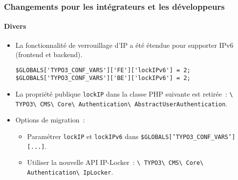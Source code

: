 \begin{frame}[fragile]
	\frametitle{Changements pour les intégrateurs et les développeurs}
	\framesubtitle{Divers}

	\lstset{basicstyle=\tiny\ttfamily}

	\begin{itemize}

		\item La fonctionnalité de verrouillage d'IP a été étendue pour supporter IPv6
			(frontend et backend).

\begin{lstlisting}
$GLOBALS['TYPO3_CONF_VARS']['FE']['lockIPv6'] = 2;
$GLOBALS['TYPO3_CONF_VARS']['BE']['lockIPv6'] = 2;
\end{lstlisting}

		\item La propriété publique \texttt{lockIP} dans la classe PHP suivante est retirée~:\newline
			\small
				\texttt{\textbackslash
					TYPO3\textbackslash
					CMS\textbackslash
					Core\textbackslash
					Authentication\textbackslash
					AbstractUserAuthentication}.
			\normalsize

		\item Options de migration~:

			\begin{itemize}\smaller
				\item[\ding{228}] Paramétrer \texttt{lockIP} et \texttt{lockIPv6} dans \texttt{\$GLOBALS['TYPO3\_CONF\_VARS'][...]}.
				\item[\ding{228}] Utiliser la nouvelle API IP-Locker~:
					\texttt{\textbackslash
						TYPO3\textbackslash
						CMS\textbackslash
						Core\textbackslash
						Authentication\textbackslash
						IpLocker}.
			\end{itemize}\normalsize


	\end{itemize}

\end{frame}


